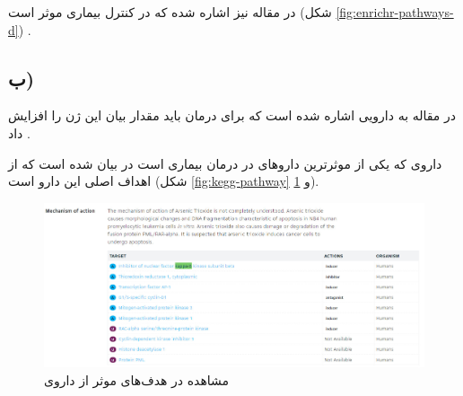 \documentclass{article}
\begin{document}
در مقاله \cite{cell-cycle} نیز اشاره شده که  در کنترل بیماری موثر است (شکل \ref{fig:enrichr-pathways-d})
.

\subsection*{ب)}
در مقاله \cite{irf8} به دارویی اشاره شده است که برای درمان  باید مقدار بیان این ژن را افزایش داد
.

داروی  که یکی از موثرترین داروهای در درمان بیماری  است در \cite{kappa} بیان شده است که  از اهداف اصلی این دارو است (شکل \ref{fig:kegg-pathway} و \ref{fig:kappa}).

\begin{figure}[h!]
	\centering
	\includegraphics[width=0.5\columnwidth]{figs/kappa.jpg}
	\caption{مشاهده  در هدف‌های موثر از داروی }
	\label{fig:kappa}
\end{figure}

\clearpage
\end{document}
